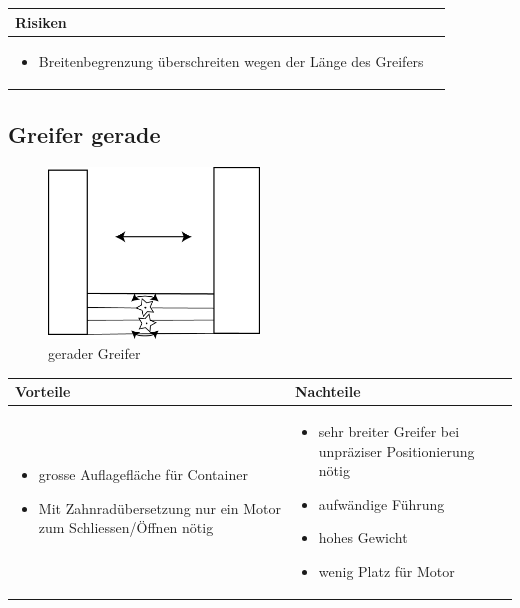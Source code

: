 \begin{table}[h]
\begin{tabular}{p{}p{}}


 \textbf{Risiken} & \\ \hline
	 
\begin{itemize}
\item Breitenbegrenzung überschreiten wegen der Länge des Greifers
\end{itemize}

 
\end{tabular}
\end{table}

\pagebreak


\subsection{Greifer gerade}
\begin{figure} [hbp]
	\centering
	\includegraphics[width=0.5\textwidth]{fig/Greifer_gerade.png}
	\caption{gerader Greifer}
\end{figure}

\begin{table}[h]
\begin{tabular}{p{} | p{}}


 \textbf{Vorteile} & \textbf{Nachteile} \\ \hline
	 
\begin{itemize}
\item grosse Auflagefläche für Container
\item Mit Zahnradübersetzung nur ein Motor zum Schliessen/Öffnen nötig
\end{itemize}

 
 &
 
\begin{itemize}
\item sehr breiter Greifer bei unpräziser Positionierung nötig
\item aufwändige Führung
\item hohes Gewicht
\item wenig Platz für Motor
\end{itemize}

\end{tabular}
\end{table}

